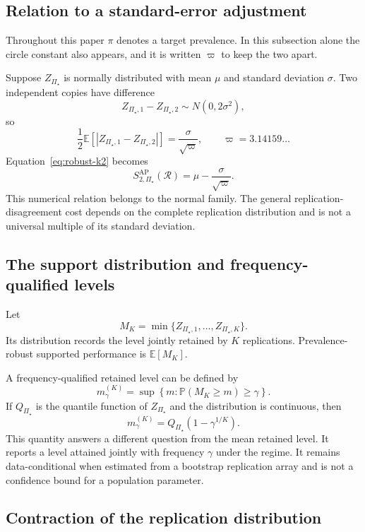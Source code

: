 \documentclass[11pt]{article}
\newcommand{\Regime}{\mathcal{R}}
\newcommand{\PSet}{\Pi_\star}
\newcommand{\E}{\mathbb{E}}
\newcommand{\Prb}{\mathbb{P}}
\theoremstyle{remark}
\begin{document}
\subsection{Relation to a standard-error adjustment}

Throughout this paper $\pi$ denotes a target prevalence. In this subsection alone the circle constant also appears, and it is written $\varpi$ to keep the two apart.

Suppose $Z_{\PSet}$ is normally distributed with mean $\mu$ and standard deviation $\sigma$. Two independent copies have difference
\[
Z_{\PSet,1}-Z_{\PSet,2}
\sim
N(0,2\sigma^2),
\]
so
\[
\frac12
\E
\left[
|Z_{\PSet,1}-Z_{\PSet,2}|
\right]
=
\frac{\sigma}{\sqrt{\varpi}},
\qquad
\varpi=3.14159\ldots
\]
Equation~\eqref{eq:robust-k2} becomes
\[
S_{2,\PSet}^{\mathrm{AP}}(\Regime)
=
\mu-\frac{\sigma}{\sqrt{\varpi}}.
\]
This numerical relation belongs to the normal family. The general replication-disagreement cost depends on the complete replication distribution and is not a universal multiple of its standard deviation.

\subsection{The support distribution and frequency-qualified levels}

Let
\[
M_K
=
\min\{Z_{\PSet,1},\ldots,Z_{\PSet,K}\}.
\]
Its distribution records the level jointly retained by $K$ replications. Prevalence-robust supported performance is $\E[M_K]$.

A frequency-qualified retained level can be defined by
\[
m_\gamma^{(K)}
=
\sup
\left\{
m:
\Prb(M_K\geq m)\geq\gamma
\right\}.
\]
If $Q_{\PSet}$ is the quantile function of $Z_{\PSet}$ and the distribution is continuous, then
\begin{equation}
m_\gamma^{(K)}
=
Q_{\PSet}\left(1-\gamma^{1/K}\right).
\label{eq:frequency-level}
\end{equation}
This quantity answers a different question from the mean retained level. It reports a level attained jointly with frequency $\gamma$ under the regime. It remains data-conditional when estimated from a bootstrap replication array and is not a confidence bound for a population parameter.

\subsection{Contraction of the replication distribution}
\end{document}
